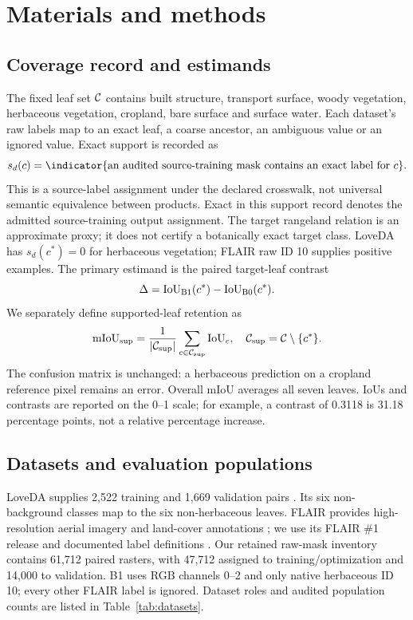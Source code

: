 \section{Materials and methods}
\label{sec:methods}
\subsection{Coverage record and estimands}
\label{sec:estimands}
The fixed leaf set \(\mathcal{C}\) contains built structure, transport surface, woody vegetation, herbaceous vegetation, cropland, bare surface and surface water. Each dataset's raw labels map to an exact leaf, a coarse ancestor, an ambiguous value or an ignored value. Exact support is recorded as
\begin{equation}
s_d(c)=\indicator{\text{an audited source-training mask contains an exact label for }c}.
\label{eq:support}
\end{equation}
This is a source-label assignment under the declared crosswalk, not universal semantic equivalence between products. Exact in this support record denotes the admitted source-training output assignment. The target rangeland relation is an approximate proxy; it does not certify a botanically exact target class. LoveDA has \(s_d(c^*)=0\) for herbaceous vegetation; FLAIR raw ID 10 supplies positive examples. The primary estimand is the paired target-leaf contrast
\begin{equation}
\Delta=\mathrm{IoU}_{\mathrm{B1}}(c^*)-\mathrm{IoU}_{\mathrm{B0}}(c^*).
\label{eq:oem_estimand}
\end{equation}
We separately define supported-leaf retention as
\begin{equation}
\mathrm{mIoU}_{\mathrm{sup}}=\frac{1}{|\mathcal{C}_{\mathrm{sup}}|}\sum_{c\in\mathcal{C}_{\mathrm{sup}}}\mathrm{IoU}_c,
\quad \mathcal{C}_{\mathrm{sup}}=\mathcal{C}\setminus\{c^*\}.
\label{eq:supported_miou}
\end{equation}
The confusion matrix is unchanged: a herbaceous prediction on a cropland reference pixel remains an error. Overall mIoU averages all seven leaves. IoUs and contrasts are reported on the 0--1 scale; for example, a contrast of 0.3118 is 31.18 percentage points, not a relative percentage increase.

\subsection{Datasets and evaluation populations}
\label{sec:datasets}
LoveDA supplies 2,522 training and 1,669 validation pairs \citep{wang2021loveda}. Its six non-background classes map to the six non-herbaceous leaves. FLAIR provides high-resolution aerial imagery and land-cover annotations \citep{garioud2023flair}; we use its FLAIR \#1 release and documented label definitions \citep{ign2026flair1}. Our retained raw-mask inventory contains 61,712 paired rasters, with 47,712 assigned to training/optimization and 14,000 to validation. B1 uses RGB channels 0--2 and only native herbaceous ID 10; every other FLAIR label is ignored. Dataset roles and audited population counts are listed in Table~\ref{tab:datasets}.


